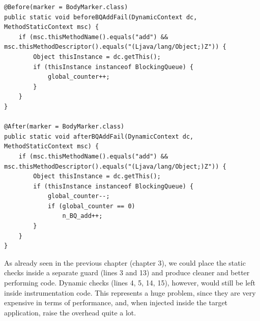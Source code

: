 \documentclass[]{usiinfthesis}
\begin{document}
\vspace*{0.5cm}
\begin{verbatim}
@Before(marker = BodyMarker.class)
public static void beforeBQAddFail(DynamicContext dc, MethodStaticContext msc) {
    if (msc.thisMethodName().equals("add") && msc.thisMethodDescriptor().equals("(Ljava/lang/Object;)Z")) {
        Object thisInstance = dc.getThis();
        if (thisInstance instanceof BlockingQueue) {
            global_counter++;
        }
    }
}

@After(marker = BodyMarker.class)
public static void afterBQAddFail(DynamicContext dc, MethodStaticContext msc) {
    if (msc.thisMethodName().equals("add") && msc.thisMethodDescriptor().equals("(Ljava/lang/Object;)Z")) {
        Object thisInstance = dc.getThis();
        if (thisInstance instanceof BlockingQueue) {
            global_counter--;
            if (global_counter == 0)
                n_BQ_add++;
        }
    }
}
\end{verbatim}
\vspace*{0.5cm}

\noindent
As already seen in the previous chapter (chapter 3), we could place the static checks inside a separate guard (lines 3 and 13) and produce cleaner and better performing code. Dynamic checks (lines 4, 5, 14, 15), however, would still be left inside instrumentation code. This represents a huge problem, since they are very expensive in terms of performance, and, when injected inside the target application, raise the overhead quite a lot. 
\end{document}
